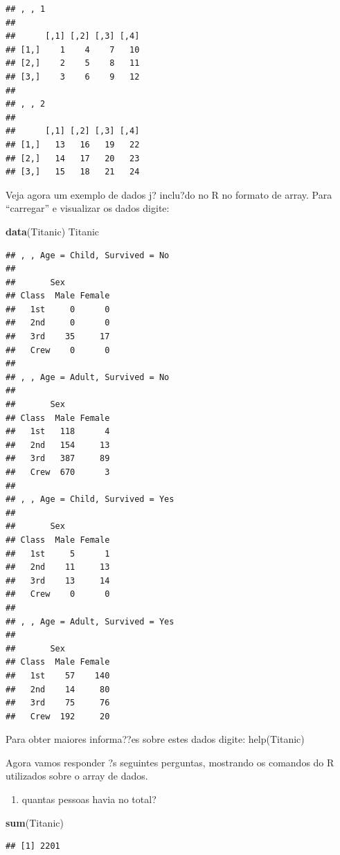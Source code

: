\documentclass[]{book}
\newenvironment{Shaded}{\begin{snugshade}}{\end{snugshade}}
\newcommand{\KeywordTok}[1]{\textcolor[rgb]{0.13,0.29,0.53}{\textbf{#1}}}
\newcommand{\NormalTok}[1]{#1}
\providecommand{\tightlist}{%
  \setlength{\itemsep}{0pt}\setlength{\parskip}{0pt}}
\begin{document}
\begin{verbatim}
## , , 1
## 
##      [,1] [,2] [,3] [,4]
## [1,]    1    4    7   10
## [2,]    2    5    8   11
## [3,]    3    6    9   12
## 
## , , 2
## 
##      [,1] [,2] [,3] [,4]
## [1,]   13   16   19   22
## [2,]   14   17   20   23
## [3,]   15   18   21   24
\end{verbatim}

Veja agora um exemplo de dados j? inclu?do no R no formato de array. Para ``carregar'' e visualizar os dados digite:

\begin{Shaded}
\begin{Highlighting}[]
\KeywordTok{data}\NormalTok{(Titanic) }
\NormalTok{Titanic}
\end{Highlighting}
\end{Shaded}

\begin{verbatim}
## , , Age = Child, Survived = No
## 
##       Sex
## Class  Male Female
##   1st     0      0
##   2nd     0      0
##   3rd    35     17
##   Crew    0      0
## 
## , , Age = Adult, Survived = No
## 
##       Sex
## Class  Male Female
##   1st   118      4
##   2nd   154     13
##   3rd   387     89
##   Crew  670      3
## 
## , , Age = Child, Survived = Yes
## 
##       Sex
## Class  Male Female
##   1st     5      1
##   2nd    11     13
##   3rd    13     14
##   Crew    0      0
## 
## , , Age = Adult, Survived = Yes
## 
##       Sex
## Class  Male Female
##   1st    57    140
##   2nd    14     80
##   3rd    75     76
##   Crew  192     20
\end{verbatim}

Para obter maiores informa??es sobre estes dados digite: help(Titanic)

Agora vamos responder ?s seguintes perguntas, mostrando os comandos do R utilizados sobre o array de dados.

\begin{enumerate}
\def\labelenumi{\arabic{enumi}.}
\tightlist
\item
  quantas pessoas havia no total?
\end{enumerate}

\begin{Shaded}
\begin{Highlighting}[]
\KeywordTok{sum}\NormalTok{(Titanic)}
\end{Highlighting}
\end{Shaded}

\begin{verbatim}
## [1] 2201
\end{verbatim}
\end{document}
